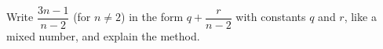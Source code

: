Write $\dfrac{3n-1}{n-2}$ (for $n\ne2$) in the form $q+\dfrac{r}{n-2}$ with constants $q$ and $r$, like a mixed number, and explain the method.
